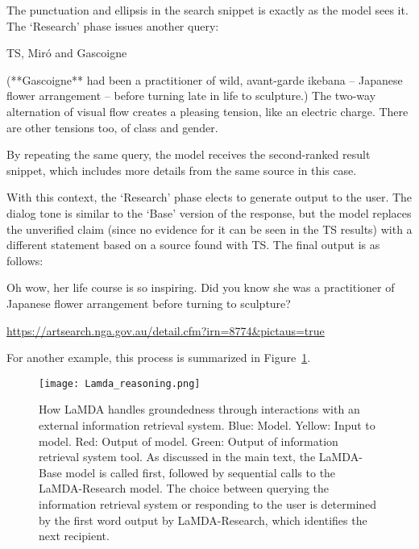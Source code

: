 \documentclass{article}
\def\knowledgetool{information retrieval system\xspace}
\def\knowledgetoolshort{TS\xspace}
\begin{document}
The punctuation and ellipsis in the search snippet is exactly as the model sees it. The `Research' phase issues another query:

\begin{dialogue}
 \knowledgetoolshort, Mir\'o and Gascoigne

\speak{\knowledgetoolshort} (**Gascoigne** had been a practitioner of wild, avant-garde ikebana – Japanese flower arrangement – before turning late in life to sculpture.) The two-way alternation of visual flow creates a pleasing tension, like an electric charge. There are other tensions too, of class and gender. \par \texttt{}
\end{dialogue}

By repeating the same query, the model receives the second-ranked result snippet, which includes more details from the same source in this case.

With this context, the ‘Research’ phase elects to generate output to the user. The dialog tone is similar to the `Base' version of the response, but the model replaces the unverified claim (since no evidence for it can be seen in the TS results) with a different statement based on a source found with \knowledgetoolshort. The final output is as follows: 

\begin{dialogue}
 Oh wow, her life course is so inspiring. Did you know she was a practitioner of Japanese flower arrangement before turning to sculpture? \par \url{https://artsearch.nga.gov.au/detail.cfm?irn=8774&pictaus=true}
\end{dialogue}

For another example, this process is summarized in Figure~\ref{fig:reasoning}.

  \begin{figure}[thbp]
    \centering
\texttt{[image: Lamda\_reasoning.png]}
    \caption{How LaMDA handles groundedness through interactions with an external \knowledgetool. Blue: Model. Yellow: Input to model. Red: Output of model. Green: Output of \knowledgetool tool. As discussed in the main text, the LaMDA-Base model is called first, followed by sequential calls to the LaMDA-Research model. The choice between querying the \knowledgetool or responding to the user is determined by the first word output by LaMDA-Research, which identifies the next recipient.
    }
    \label{fig:reasoning}
\end{figure}
\end{document}
